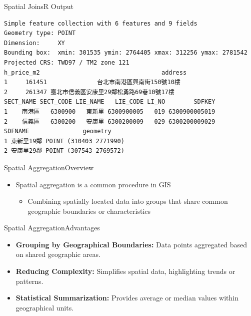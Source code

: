 \documentclass[hyperref={pdfpagelabels=false}]{beamer}
\begin{document}
\begin{frame}[fragile]{Spatial Joins}{R Output}
	
	\tiny
	
\begin{lstlisting}
Simple feature collection with 6 features and 9 fields
Geometry type: POINT
Dimension:     XY
Bounding box:  xmin: 301535 ymin: 2764405 xmax: 312256 ymax: 2781542
Projected CRS: TWD97 / TM2 zone 121
h_price_m2                                  address
1     161451              台北市南港區興南街150號10樓
2     261347 臺北市信義區安康里29鄰松勇路69巷10號17樓
SECT_NAME SECT_CODE LIE_NAME   LIE_CODE LI_NO        SDFKEY
1    南港區   6300900   東新里 6300900005   019 6300900005019
2    信義區   6300200   安康里 6300200009   029 6300200009029
SDFNAME               geometry
1 東新里19鄰 POINT (310403 2771990)
2 安康里29鄰 POINT (307543 2769572)
\end{lstlisting}
	
\end{frame}








\begin{frame}{Spatial Aggregation}{Overview}
	
	\begin{itemize}
		\item Spatial aggregation is a common procedure in GIS
					\vspace{0.2cm}
			\begin{itemize}
		 \item Combining spatially located data into groups that share common geographic boundaries or characteristics
		 
		 	\end{itemize}
	
	\end{itemize}
\end{frame}

\begin{frame}{Spatial Aggregation}{Advantages}
	
	\begin{itemize}
		\item \textbf{Grouping by Geographical Boundaries:} Data points aggregated based on shared geographic areas.
							\vspace{0.2cm}
		\item \textbf{Reducing Complexity:} Simplifies spatial data, highlighting trends or patterns.
							\vspace{0.2cm}
		\item \textbf{Statistical Summarization:} Provides average or median values within geographical units.
	\end{itemize}
\end{frame}
\end{document}

